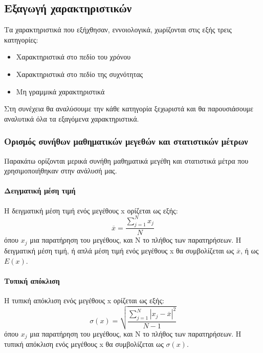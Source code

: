 \subsection{Εξαγωγή χαρακτηριστικών}

Τα χαρακτηριστικά που εξήχθησαν, εννοιολογικά, χωρίζονται στις εξής τρεις κατηγορίες:
\begin{itemize}
    \item Χαρακτηριστικά στο πεδίο του χρόνου
    \item Χαρακτηριστικά στο πεδίο της συχνότητας
    \item Μη γραμμικά χαρακτηριστικά
\end{itemize}

Στη συνέχεια θα αναλύσουμε την κάθε κατηγορία ξεχωριστά και θα παρουσιάσουμε αναλυτικά όλα τα εξαγόμενα χαρακτηριστικά.

\subsubsection*{Ορισμός συνήθων μαθηματικών μεγεθών και στατιστικών μέτρων}
Παρακάτω ορίζονται μερικά συνήθη μαθηματικά μεγέθη και στατιστικά μέτρα που χρησιμοποιήθηκαν στην ανάλυσή μας.
\paragraph{Δειγματική μέση τιμή}
Η δειγματική μέση τιμή ενός μεγέθους x ορίζεται ως εξής:
\begin{equation}
\label{eq:mean}
   \overline{x}=\frac{\sum_{j=1}^{N} x_j}{N}
\end{equation}
όπου $x_j$ μια παρατήρηση του μεγέθους, και Ν το πλήθος των παρατηρήσεων. Η δειγματική μέση τιμή, ή απλά μέση τιμή ενός μεγέθους x θα συμβολίζεται ως $\overline{x}$, ή ως $E(x)$.

\paragraph{Τυπική απόκλιση}
Η τυπική απόκλιση ενός μεγέθους x ορίζεται ως εξής:
\begin{equation}
\label{eq:standard_deviation}
   \sigma(x)=\sqrt{\frac{\sum_{j=1}^{N} |x_j-\overline{x}|^2 }{N-1}}
\end{equation}
όπου $x_j$ μια παρατήρηση του μεγέθους, και Ν το πλήθος των παρατηρήσεων. Η τυπική απόκλιση ενός μεγέθους x θα συμβολίζεται ως $\sigma(x)$.


